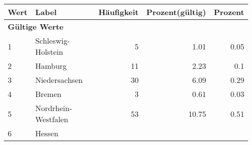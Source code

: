      \begin{longtable}{lXrrr}
     \toprule
     \textbf{Wert} & \textbf{Label} & \textbf{Häufigkeit} & \textbf{Prozent(gültig)} & \textbf{Prozent} \\
     \endhead
     \midrule
     \multicolumn{5}{l}{\textbf{Gültige Werte}}\\

     1 &
     \multicolumn{1}{X}{ Schleswig-Holstein   } &


       \num{5} &
       \num[round-mode=places,round-precision=2]{1.01} &
         \num[round-mode=places,round-precision=2]{0.05} \\

     2 &
     \multicolumn{1}{X}{ Hamburg   } &


       \num{11} &
       \num[round-mode=places,round-precision=2]{2.23} &
         \num[round-mode=places,round-precision=2]{0.1} \\

     3 &
     \multicolumn{1}{X}{ Niedersachsen   } &


       \num{30} &
       \num[round-mode=places,round-precision=2]{6.09} &
         \num[round-mode=places,round-precision=2]{0.29} \\

     4 &
     \multicolumn{1}{X}{ Bremen   } &


       \num{3} &
       \num[round-mode=places,round-precision=2]{0.61} &
         \num[round-mode=places,round-precision=2]{0.03} \\

     5 &
     \multicolumn{1}{X}{ Nordrhein-Westfalen   } &


       \num{53} &
       \num[round-mode=places,round-precision=2]{10.75} &
         \num[round-mode=places,round-precision=2]{0.51} \\

     6 &
     \multicolumn{1}{X}{ Hessen   } &



\end{longtable}
